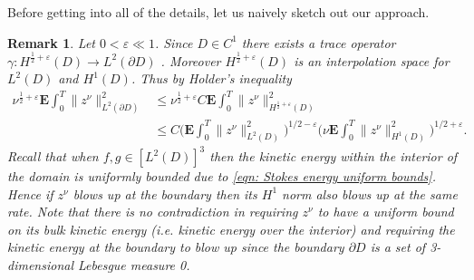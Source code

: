 \documentclass[11pt, reqno]{article}
\newtheorem{remark}[theorem]{Remark}
\def\E{\mathbf{E}}
\begin{document}
Before getting into all of the details, let us naively sketch out our approach.
\begin{remark}\label{remark: Naive approach}
    Let $0 < \varepsilon \ll 1$. Since $D \in C^1$ there exists a trace operator $\gamma: H^{\frac{1}{2} + \varepsilon}(D) \to L^2(\partial D)$ \cite{schneider2010trace}. Moreover $H^{\frac{1}{2} + \varepsilon}(D)$ is an interpolation space for $L^2(D)$ and $H^1(D)$. Thus by Holder's inequality 
    \begin{align*}
         \nu^{\frac{1}{2} + \varepsilon}\E\int_0^T\|z^\nu\|_{L^2(\partial D)}^2 &\leq \nu^{\frac{1}{2} + \varepsilon}C\E\int_0^T\|z^\nu\|_{H^{\frac{1}{2} + \varepsilon}(D)}^2\\
         &\leq C\Big(\E\int_0^T\|z^\nu\|_{L^2(D)}^2\Big)^{1/2 - \varepsilon}\Big(\nu\E\int_0^T\|z^\nu\|_{H^1(D)}^2\Big)^{1/2 + \varepsilon}.
    \end{align*}
    Recall that when $f,g \in [L^2(D)]^3$ then the kinetic energy within the interior of the domain is uniformly bounded due to \eqref{eqn: Stokes energy uniform bounds}. Hence if $z^\nu$ blows up at the boundary then its $H^1$ norm also blows up at the same rate. Note that there is no contradiction in requiring $z^\nu$ to have a uniform bound on its bulk kinetic energy (i.e. kinetic energy over the interior) and requiring the kinetic energy at the boundary to blow up since the boundary $\partial D$ is a set of 3-dimensional Lebesgue measure 0.
\end{remark}
\end{document}
